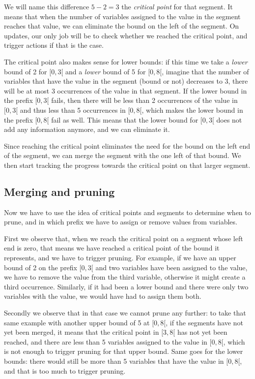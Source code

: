 \documentclass[a4paper,10pt]{article}
\begin{document}
We will name this difference $5-2=3$ the \emph{critical point} for that segment. It means that when the number of variables assigned to the value in the segment reaches that value, we can eliminate the bound on the left of the segment. On updates, our only job will be to check whether we reached the critical point, and trigger actions if that is the case.

The critical point also makes sense for lower bounds: if this time we take a \emph{lower} bound of 2 for $[0,3[$ and a \emph{lower} bound of 5 for $[0,8[$, imagine that the number of variables that have the value in the segment (bound or not) decreases to 3, there will be at most 3 occurrences of the value in that segment. If the lower bound in the prefix $[0,3[$ fails, then there will be less than 2 occurrences of the value in $[0,3[$ and thus less than 5 occurrences in $[0,8[$, which makes the lower bound in the prefix $[0,8[$ fail as well. This means that the lower bound for $[0,3[$ does not add any information anymore, and we can eliminate it.

Since reaching the critical point eliminates the need for the bound on the left end of the segment, we can merge the segment with the one left of that bound. We then start tracking the progress towards the critical point on that larger segment.

\subsection{Merging and pruning}
\label{subsec:merging-pruning}

Now we have to use the idea of critical points and segments to determine when to prune, and in which prefix we have to assign or remove values from variables.

First we observe that, when we reach the critical point on a segment whose left end is zero, that means we have reached a critical point of the bound it represents, and we have to trigger pruning. For example, if we have an upper bound of 2 on the prefix $[0,3[$ and two variables have been assigned to the value, we have to remove the value from the third variable, otherwise it might create a third occurrence. Similarly, if it had been a lower bound and there were only two variables with the value, we would have had to assign them both.

Secondly we observe that in that case we cannot prune any further: to take that same example with another upper bound of 5 at $[0,8[$, if the segments have not yet been merged, it means that the critical point in $[3,8[$ has not yet been reached, and there are less than 5 variables assigned to the value in $[0,8[$, which is not enough to trigger pruning for that upper bound. Same goes for the lower bounds: there would still be more than 5 variables that have the value in $[0,8[$, and that is too much to trigger pruning.
\end{document}
